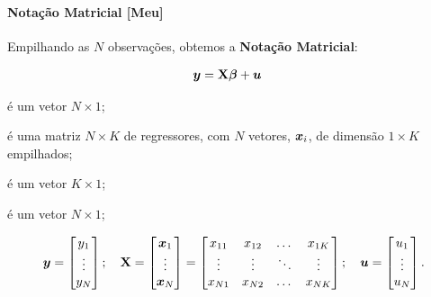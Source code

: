 \documentclass[11pt, oneside, a4paper, article]{article}
\numberwithin{equation}{section}
\begin{document}
\paragraph{Notação Matricial [Meu]}
Empilhando as $N$ observações, obtemos a \textbf{Notação Matricial}:

\vspace{-1 em}
\begin{align} \label{ols:mod:mat}
	\boldsymbol{y} &= \mathbf{X} \boldsymbol{\beta} + \boldsymbol{u} 
\end{align}

\begin{description}[noitemsep]
\item [$\mbs{y}$]  é um vetor $N \times 1$;

\item [$\Xmat$]  é uma matriz $N \times K$ de regressores, com $N$ vetores, $\boldsymbol{x}_{i}$, de dimensão $1 \times K$ empilhados;

\item [$\mbs{\beta}$] é um vetor $K \times 1$;

\item [$\mbs{u}$] é um vetor $N \times 1$;
\end{description}

\vspace{-1 em}
\begin{align*}
\boldsymbol{y} = 
\begin{bmatrix}
	y_{1} \\ \vdots \\ y_{N}		
\end{bmatrix};
\quad
\mathbf{X} = 
\begin{bmatrix}
	\boldsymbol{x}_{1} \\ \vdots \\ \boldsymbol{x}_{N}
\end{bmatrix} = 
\begin{bmatrix}
	x_{11}     & x_{12}     & \dots  & x_{1K} \\          
	\vdots     & \vdots     & \ddots & \vdots \\        
	x_{N1} & x_{N2} & \dots  & x_{NK}		
\end{bmatrix};
\quad
\boldsymbol{u} = 
\begin{bmatrix}
	u_{1} \\ \vdots \\ u_{N}		
\end{bmatrix}.
\end{align*}
\end{document}
